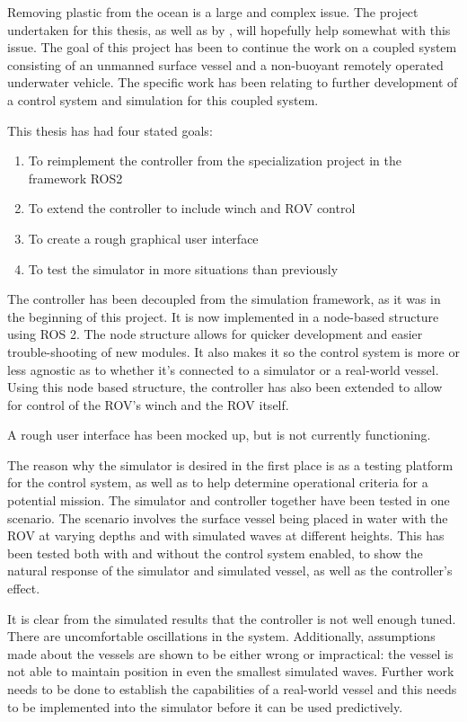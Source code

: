 \documentclass[class=article, crop=false]{standalone}
\begin{document}
Removing plastic from the ocean is a large and complex issue. The project undertaken for this thesis, as well as by \cite{specialization}, will hopefully help somewhat with this issue. The goal of this project has been to continue the work on a coupled system consisting of an unmanned surface vessel and a non-buoyant remotely operated underwater vehicle. The specific work has been relating to further development of a control system and simulation for this coupled system.

This thesis has had four stated goals:
\begin{enumerate}
\item To reimplement the controller from the specialization project in the framework ROS2
\item To extend the controller to include winch and ROV control
\item To create a rough graphical user interface
\item To test the simulator in more situations than previously
\end{enumerate}

The controller has been decoupled from the simulation framework, as it was in the beginning of this project. It is now implemented in a node-based structure using ROS 2. The node structure allows for quicker development and easier trouble-shooting of new modules. It also makes it so the control system is more or less agnostic as to whether it's connected to a simulator or a real-world vessel. Using this node based structure, the controller has also been extended to allow for control of the ROV's winch and the ROV itself.

A rough user interface has been mocked up, but is not currently functioning.

The reason why the simulator is desired in the first place is as a testing platform for the control system, as well as to help determine operational criteria for a potential mission. The simulator and controller together have been tested in one scenario. The scenario involves the surface vessel being placed in water with the ROV at varying depths and with simulated waves at different heights. This has been tested both with and without the control system enabled, to show the natural response of the simulator and simulated vessel, as well as the controller's effect.

It is clear from the simulated results that the controller is not well enough tuned. There are uncomfortable oscillations in the system. Additionally, assumptions made about the vessels are shown to be either wrong or impractical: the vessel is not able to maintain position in even the smallest simulated waves. Further work needs to be done to establish the capabilities of a real-world vessel and this needs to be implemented into the simulator before it can be used predictively.
\end{document}
